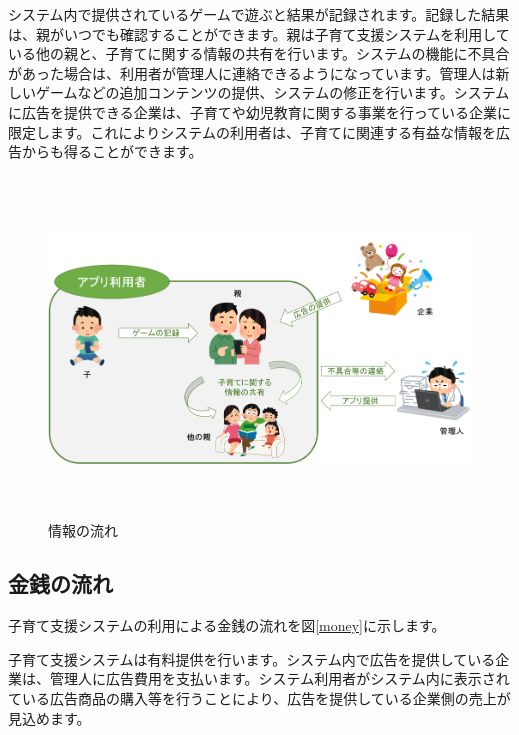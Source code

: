 \documentclass[a4j]{jarticle}
\begin{document}
システム内で提供されているゲームで遊ぶと結果が記録されます。記録した結果は、親がいつでも確認することができます。親は子育て支援システムを利用している他の親と、子育てに関する情報の共有を行います。システムの機能に不具合があった場合は、利用者が管理人に連絡できるようになっています。管理人は新しいゲームなどの追加コンテンツの提供、システムの修正を行います。システムに広告を提供できる企業は、子育てや幼児教育に関する事業を行っている企業に限定します。これによりシステムの利用者は、子育てに関連する有益な情報を広告からも得ることができます。
\begin{figure}[h]
  \begin{center}
    \includegraphics[width = 14cm, height = 9cm]{section5_info.png}
    \caption{情報の流れ}
    \label{info}
  \end{center}
\end{figure}

\newpage
\subsection{金銭の流れ}
子育て支援システムの利用による金銭の流れを図\ref{money}に示します。

子育て支援システムは有料提供を行います。システム内で広告を提供している企業は、管理人に広告費用を支払います。システム利用者がシステム内に表示されている広告商品の購入等を行うことにより、広告を提供している企業側の売上が見込めます。
\end{document}
